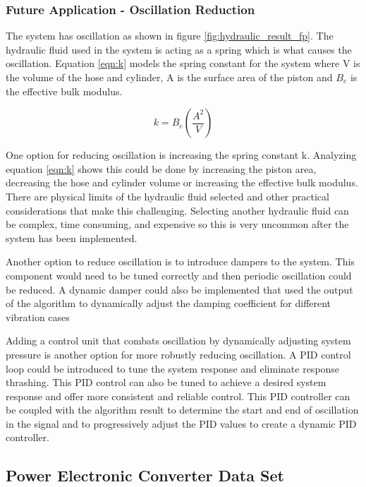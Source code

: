 \subsubsection{Future Application - Oscillation Reduction}

The system has oscillation as shown in figure \ref{fig:hydraulic_result_fp}. The hydraulic fluid used in the system is acting as a spring which is what causes the oscillation. Equation \ref{eqn:k} models the spring constant for the system where V is the volume of the hose and cylinder, A is the surface area of the piston and $B_e$ is the effective bulk modulus. 

\begin{equation}
    k = B_e \left ( \frac{A^2}{V} \right)
    \label{eqn:k}
\end{equation}

One option for reducing oscillation is increasing the spring constant k. Analyzing equation \ref{eqn:k} shows this could be done by increasing the piston area, decreasing the hose and cylinder volume or increasing the effective bulk modulus. There are physical limits of the hydraulic fluid selected and other practical considerations that make this challenging. Selecting another hydraulic fluid can be complex, time consuming, and expensive so this is very uncommon after the system has been implemented. 

Another option to reduce oscillation is to introduce dampers to the system. This component would need to be tuned correctly and then periodic oscillation could be reduced. A dynamic damper could also be implemented that used the output of the algorithm to dynamically adjust the damping coefficient for different vibration cases 

Adding a control unit that combats oscillation by dynamically adjusting system pressure is another option for more robustly reducing oscillation. A PID control loop could be introduced to tune the system response and eliminate response thrashing. This PID control can also be tuned to achieve a desired system response and offer more consistent and reliable control. This PID controller can be coupled with the algorithm result to determine the start and end of oscillation in the signal and to progressively adjust the PID values to create a dynamic PID controller.


\subsection{Power Electronic Converter Data Set}

